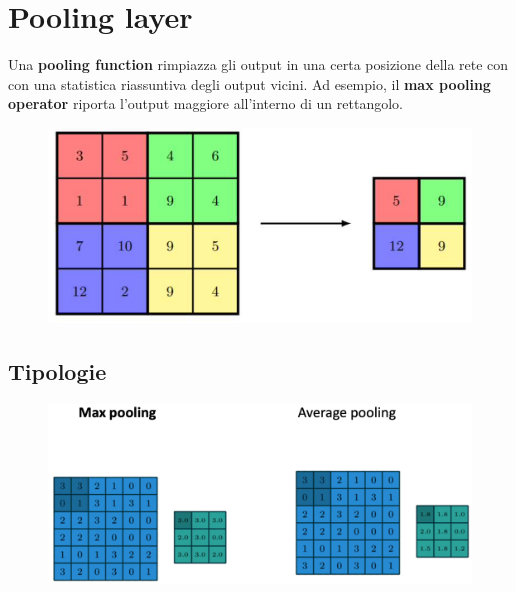 \section{Pooling layer}
Una \textbf{pooling function} rimpiazza gli output in una certa posizione della rete con con una statistica riassuntiva degli output vicini. Ad esempio, il\textbf{ max pooling operator} riporta l'output maggiore all'interno di un rettangolo.
\begin{figure}[!h]
    \includegraphics[scale=.4]{images/cnn/pooling.png}
    \centering
\end{figure}
\subsection{Tipologie}
\begin{figure}[!h]
    \includegraphics[scale=.4]{images/cnn/types.png}
    \centering
\end{figure}
